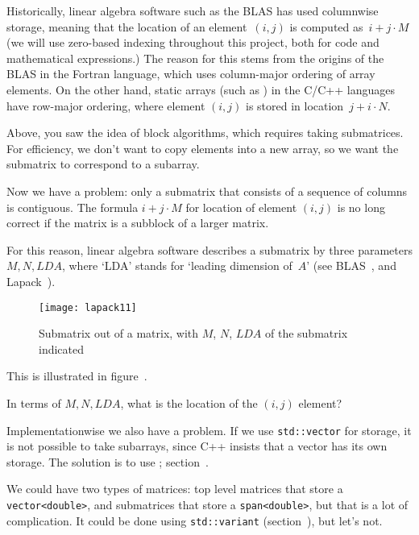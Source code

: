 \begin{remark}
  Historically, linear algebra software
  such as the \ac{BLAS}
  has used columnwise storage,
  meaning that the location of an element~$(i,j)$ is computed as~$i+j\cdot M$
  (we will use zero-based indexing throughout this project, both for code
  and mathematical expressions.)
  The reason for this stems from the origins of the \ac{BLAS}
  in the Fortran language, which uses column-major ordering of array elements.
  On the other hand, static arrays (such as )
  in the C/C++ languages have row-major ordering,
  where element $(i,j)$ is stored in location~$j+i\cdot N$.
\end{remark}

Above, you saw the idea of block algorithms, which requires taking
submatrices. For efficiency, we don't want to copy elements into a new
array, so we want the submatrix to correspond to a subarray.

Now we have a problem: only a submatrix that consists of a sequence of
columns is contiguous. The formula $i+j\cdot M$ for location of
element $(i,j)$ is no long correct if the matrix is a subblock
of a larger matrix.

For this reason, linear algebra software describes
a submatrix by three parameters
$M,N,\mathord{LDA}$, where `LDA' stands for `leading dimension
of~$A$' (see \ac{BLAS}~\cite{Lawson:blas}, and Lapack~\cite{WN20}).
%
\begin{figure}[ht]
  \texttt{[image: lapack11]}
  \caption{Submatrix out of a matrix, with $M$, $N$, $\mathit{LDA}$
    of the submatrix indicated}
  \label{fig:lapack11}
\end{figure}
%
This is illustrated in figure~.

\begin{exercise}
  In terms of $M,N,\mathord{LDA}$, what is the location of the $(i,j)$
  element?
\end{exercise}

Implementationwise we also have a problem. If we use
\lstinline{std::vector} for storage, it is not possible to take
subarrays, since C++ insists that a vector has its own storage. The
solution is to use ; section~.

We could have two types of matrices: top level matrices that store a
\lstinline{vector<double>}, and submatrices that store a
\lstinline{span<double>}, but that is a lot of complication.
It could be done using \lstinline{std::variant}
(section~), but let's not.

